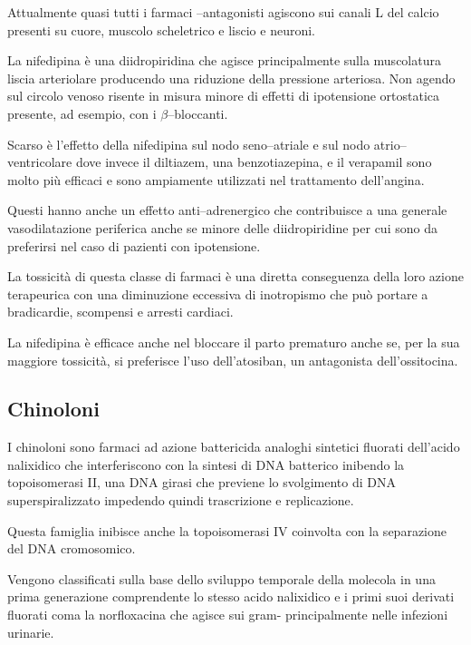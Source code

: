 Attualmente quasi tutti i farmaci --antagonisti agiscono sui canali L del calcio presenti su cuore, muscolo scheletrico e liscio e neuroni.

La nifedipina è una diidropiridina che agisce principalmente sulla muscolatura liscia arteriolare producendo una riduzione della pressione arteriosa. Non agendo sul circolo venoso risente in misura minore di effetti di ipotensione ortostatica presente, ad esempio, con i $\beta$--bloccanti. 

Scarso è l'effetto della nifedipina sul nodo seno--atriale e sul nodo atrio--ventricolare dove invece il diltiazem, una benzotiazepina, e il verapamil sono molto più efficaci e sono ampiamente utilizzati nel trattamento dell'angina.

Questi hanno anche un effetto anti--adrenergico che contribuisce a una generale vasodilatazione periferica anche se minore delle diidropiridine per cui sono da preferirsi nel caso di pazienti con ipotensione.

La tossicità di questa classe di farmaci è una diretta conseguenza della loro azione terapeurica con una diminuzione eccessiva di inotropismo che può portare a bradicardie, scompensi e arresti cardiaci.

La nifedipina è efficace anche nel bloccare il parto prematuro anche se, per la sua maggiore tossicità, si preferisce l'uso dell'atosiban, un antagonista dell'ossitocina.

\subsection{Chinoloni}

I chinoloni sono farmaci ad azione battericida analoghi sintetici fluorati dell'acido nalixidico che interferiscono con la sintesi di DNA batterico inibendo la topoisomerasi II, una DNA girasi che previene lo svolgimento di DNA superspiralizzato impedendo quindi trascrizione e replicazione.

Questa famiglia inibisce anche la topoisomerasi IV coinvolta con la separazione del DNA cromosomico.

Vengono classificati sulla base dello sviluppo temporale della molecola in una prima generazione comprendente lo stesso acido nalixidico e i primi suoi derivati fluorati coma la norfloxacina che agisce sui gram- principalmente nelle infezioni urinarie.


